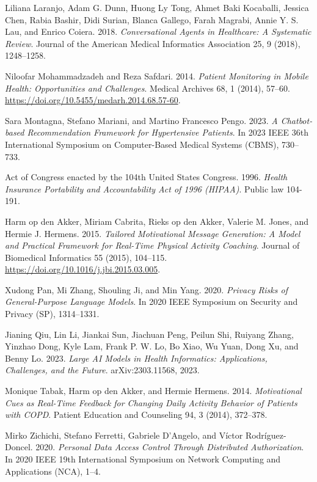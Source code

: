 \begin{thebibliography}{55}
Liliana Laranjo, Adam G. Dunn, Huong Ly Tong, Ahmet Baki Kocaballi, Jessica Chen, Rabia Bashir, Didi Surian, Blanca Gallego, Farah Magrabi, Annie Y. S. Lau, and Enrico Coiera. 2018. \emph{Conversational Agents in Healthcare: A Systematic Review}. Journal of the American Medical Informatics Association 25, 9 (2018), 1248--1258.

Niloofar Mohammadzadeh and Reza Safdari. 2014. \emph{Patient Monitoring in Mobile Health: Opportunities and Challenges}. Medical Archives 68, 1 (2014), 57--60. \url{https://doi.org/10.5455/medarh.2014.68.57-60}.

Sara Montagna, Stefano Mariani, and Martino Francesco Pengo. 2023. \emph{A Chatbot-based Recommendation Framework for Hypertensive Patients}. In 2023 IEEE 36th International Symposium on Computer-Based Medical Systems (CBMS), 730--733.

Act of Congress enacted by the 104th United States Congress. 1996. \emph{Health Insurance Portability and Accountability Act of 1996 (HIPAA)}. Public law 104-191.

Harm op den Akker, Miriam Cabrita, Rieks op den Akker, Valerie M. Jones, and Hermie J. Hermens. 2015. \emph{Tailored Motivational Message Generation: A Model and Practical Framework for Real-Time Physical Activity Coaching}. Journal of Biomedical Informatics 55 (2015), 104--115. \url{https://doi.org/10.1016/j.jbi.2015.03.005}.

Xudong Pan, Mi Zhang, Shouling Ji, and Min Yang. 2020. \emph{Privacy Risks of General-Purpose Language Models}. In 2020 IEEE Symposium on Security and Privacy (SP), 1314--1331.

Jianing Qiu, Lin Li, Jiankai Sun, Jiachuan Peng, Peilun Shi, Ruiyang Zhang, Yinzhao Dong, Kyle Lam, Frank P. W. Lo, Bo Xiao, Wu Yuan, Dong Xu, and Benny Lo. 2023. \emph{Large AI Models in Health Informatics: Applications, Challenges, and the Future}. arXiv:2303.11568, 2023.

Monique Tabak, Harm op den Akker, and Hermie Hermens. 2014. \emph{Motivational Cues as Real-Time Feedback for Changing Daily Activity Behavior of Patients with COPD}. Patient Education and Counseling 94, 3 (2014), 372--378.

Mirko Zichichi, Stefano Ferretti, Gabriele D’Angelo, and Víctor Rodríguez-Doncel. 2020. \emph{Personal Data Access Control Through Distributed Authorization}. In 2020 IEEE 19th International Symposium on Network Computing and Applications (NCA), 1--4.


\end{thebibliography}
